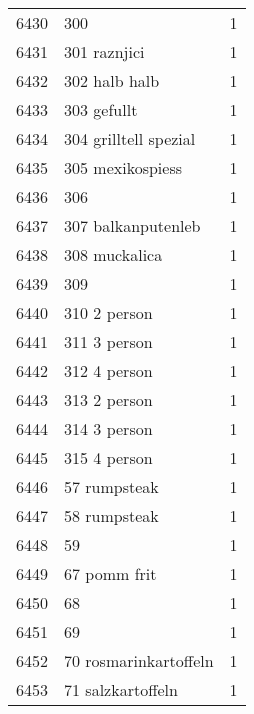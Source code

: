 \begin{tabular}{llr}
6430 &                                                300 &      1 \\
6431 &                                       301 raznjici &      1 \\
6432 &                                      302 halb halb &      1 \\
6433 &                                        303 gefullt &      1 \\
6434 &                              304 grilltell spezial &      1 \\
6435 &                                   305 mexikospiess &      1 \\
6436 &                                                306 &      1 \\
6437 &                                 307 balkanputenleb &      1 \\
6438 &                                      308 muckalica &      1 \\
6439 &                                                309 &      1 \\
6440 &                                       310 2 person &      1 \\
6441 &                                       311 3 person &      1 \\
6442 &                                       312 4 person &      1 \\
6443 &                                       313 2 person &      1 \\
6444 &                                       314 3 person &      1 \\
6445 &                                       315 4 person &      1 \\
6446 &                                       57 rumpsteak &      1 \\
6447 &                                       58 rumpsteak &      1 \\
6448 &                                                 59 &      1 \\
6449 &                                       67 pomm frit &      1 \\
6450 &                                                 68 &      1 \\
6451 &                                                 69 &      1 \\
6452 &                              70 rosmarinkartoffeln &      1 \\
6453 &                                  71 salzkartoffeln &      1 \\

\end{tabular}
